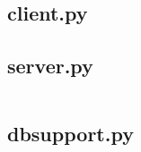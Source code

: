 \documentclass[a4paper,12pt]{article}
\begin{document}
\subsection{client.py}
\begin{alltt}

\end{alltt}

\subsection{server.py}
\begin{verbatim}

\end{verbatim}

\subsection{dbsupport.py}
\begin{alltt}

\end{alltt}





% 
% 
% 
% 
% 
% 
\end{document}
